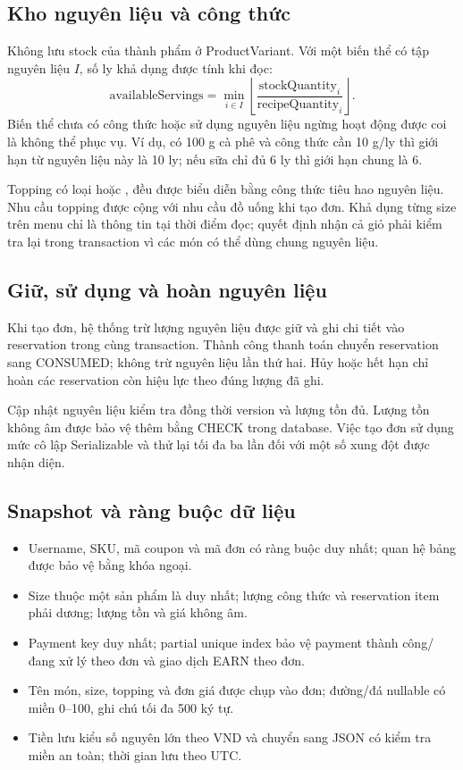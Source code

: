 \subsection{Kho nguyên liệu và công thức}
Không lưu stock của thành phẩm ở ProductVariant. Với một biến thể có tập
nguyên liệu $I$, số ly khả dụng được tính khi đọc:
\[
    \text{availableServings} =
    \min_{i\in I}\left\lfloor\frac{\text{stockQuantity}_i}
    {\text{recipeQuantity}_i}\right\rfloor.
\]
Biến thể chưa có công thức hoặc sử dụng nguyên liệu ngừng hoạt động được
coi là không thể phục vụ. Ví dụ, có 100 g cà phê và công thức cần 10 g/ly
thì giới hạn từ nguyên liệu này là 10 ly; nếu sữa chỉ đủ 6 ly thì giới hạn
chung là 6.

Topping có loại  hoặc , đều được biểu
diễn bằng công thức tiêu hao nguyên liệu. Nhu cầu topping được cộng với
nhu cầu đồ uống khi tạo đơn. Khả dụng từng size trên menu chỉ là thông
tin tại thời điểm đọc; quyết định nhận cả giỏ phải kiểm tra lại trong
transaction vì các món có thể dùng chung nguyên liệu.

\subsection{Giữ, sử dụng và hoàn nguyên liệu}
Khi tạo đơn, hệ thống trừ lượng nguyên liệu được giữ và ghi chi tiết vào
reservation trong cùng transaction. Thành công thanh toán chuyển
reservation sang CONSUMED; không trừ nguyên liệu lần thứ hai. Hủy hoặc
hết hạn chỉ hoàn các reservation còn hiệu lực theo đúng lượng đã ghi.

Cập nhật nguyên liệu kiểm tra đồng thời version và lượng tồn đủ. Lượng
tồn không âm được bảo vệ thêm bằng CHECK trong database. Việc tạo đơn sử
dụng mức cô lập Serializable và thử lại tối đa ba lần đối với một số
xung đột được nhận diện.

\subsection{Snapshot và ràng buộc dữ liệu}
\begin{itemize}
    \item Username, SKU, mã coupon và mã đơn có ràng buộc duy nhất;
    quan hệ bảng được bảo vệ bằng khóa ngoại.
    \item Size thuộc một sản phẩm là duy nhất; lượng công thức và
    reservation item phải dương; lượng tồn và giá không âm.
    \item Payment key duy nhất; partial unique index bảo vệ payment
    thành công/đang xử lý theo đơn và giao dịch EARN theo đơn.
    \item Tên món, size, topping và đơn giá được chụp vào đơn; đường/đá
    nullable có miền 0--100, ghi chú tối đa 500 ký tự.
    \item Tiền lưu kiểu số nguyên lớn theo VND và chuyển sang JSON có
    kiểm tra miền an toàn; thời gian lưu  theo UTC.
\end{itemize}

